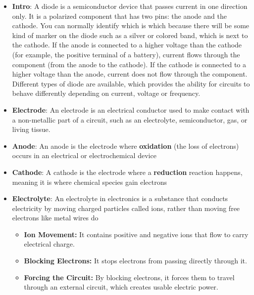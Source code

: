 \documentclass{report}
\begin{document}
    \pagebreak 
    \begin{itemize}  
        \item \textbf{Intro}: A diode is a semiconductor device that passes current in one direction only.
            \bigbreak \noindent 
            It is a polarized component that has two pins: the anode and the cathode. You can normally identify which is which because there will be some kind of marker on the diode such as a silver or colored band, which is next to the cathode.
            \bigbreak \noindent 
            \bigbreak \noindent 
            If the anode is connected to a higher voltage than the cathode (for example, the positive terminal of a battery), current flows through the component (from the anode to the cathode). If the cathode is connected to a higher voltage than the anode, current does not flow through the component.
            \bigbreak \noindent 
            Different types of diode are available, which provides the ability for circuits to behave differently depending on current, voltage or frequency.
        \item \textbf{Electrode}: An electrode is an electrical conductor used to make contact with a non-metallic part of a circuit, such as an electrolyte, semiconductor, gas, or living tissue.
        \item \textbf{Anode}:  An anode is the electrode where \textbf{oxidation} (the loss of electrons) occurs in an electrical or electrochemical device
        \item \textbf{Cathode}: A cathode is the electrode where a \textbf{reduction} reaction happens, meaning it is where chemical species gain electrons
        \item \textbf{Electrolyte}: An electrolyte in electronics is a substance that conducts electricity by moving charged particles called ions, rather than moving free electrons like metal wires do
            \begin{itemize}
                \item \textbf{Ion Movement:} It contains positive and negative ions that flow to carry electrical charge.
                \item \textbf{Blocking Electrons:} It stops electrons from passing directly through it.
                \item \textbf{Forcing the Circuit:} By blocking electrons, it forces them to travel through an external circuit, which creates usable electric power.
            \end{itemize}

\end{itemize}
\end{document}
